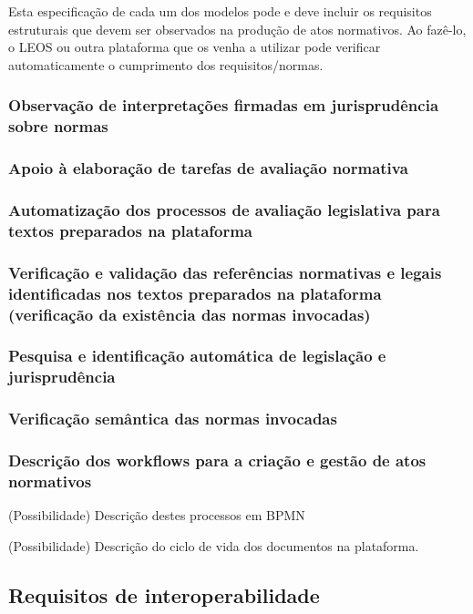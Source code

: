 Esta especificação de cada um dos modelos pode e deve incluir os requisitos estruturais que devem ser observados na 
produção de atos normativos. Ao fazê-lo, o LEOS ou outra plataforma que os venha a utilizar pode verificar automaticamente 
o cumprimento dos requisitos/normas.

\subsubsection{Observação de interpretações firmadas em jurisprudência sobre normas}

\subsubsection{Apoio à elaboração de tarefas de avaliação normativa}

\subsubsection{Automatização dos processos de avaliação legislativa para textos preparados na plataforma}

\subsubsection{Verificação e validação das referências normativas e legais identificadas nos textos preparados
na plataforma (verificação da existência das normas invocadas)}

\subsubsection{Pesquisa e identificação automática de legislação e jurisprudência}

\subsubsection{Verificação semântica das normas invocadas}

\subsubsection{Descrição dos workflows para a criação e gestão de atos normativos}

(Possibilidade) Descrição destes processos em BPMN

(Possibilidade) Descrição do ciclo de vida dos documentos na plataforma.


\subsection{Requisitos de interoperabilidade}

